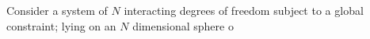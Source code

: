 Consider a system of $N$ interacting degrees of freedom subject to a global constraint; lying on an $N$ dimensional sphere o